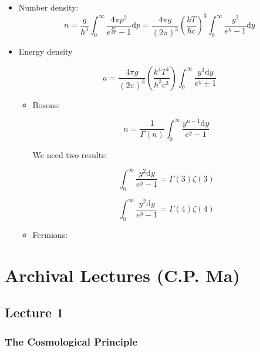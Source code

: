 \documentclass{article}
\newcommand{\be}{\begin{equation}}
\newcommand{\ee}{\end{equation}}
\begin{document}
\begin{itemize}
    \item Number density:
    \be
    n = \frac{g}{h^3}\int_0^\infty \frac{4\pi p^2}{e^{\frac{pc}{kT}} -1} \mathrm{d}p = \frac{4\pi g}{(2\pi)^3} \left(\frac{kT}{\hbar c}\right)^3 \int_0^\infty \frac{y^2}{e^{y} -1} \mathrm{d}y  
    \ee
    
    \item Energy density
    
    \be
    u = \frac{4\pi g}{(2\pi)^3}\left(\frac{k^4T^4}{\hbar^3 c^3}\right) \int_0^\infty \frac{y^3 \mathrm{d}y}{e^y \pm 1}
    \ee
    
    \begin{itemize}
        \item Bosons:
        
        \be
        n = \frac{1}{\Gamma(n)}\int_0^\infty \frac{y^{n-1} \mathrm{d}y}{e^y - 1}
        \ee
        
        We need two results:
        
        \be
        \int_0^\infty \frac{y^{2} \mathrm{d}y}{e^y - 1} = \Gamma(3) \zeta(3)
        \ee
        
        \be
        \int_0^\infty \frac{y^{2} \mathrm{d}y}{e^y - 1} = \Gamma(4) \zeta(4)
        \ee
        
        
        
        \item Fermions:
    \end{itemize}
\end{itemize}














\appendix 

\section{Archival Lectures (C.P. Ma)}

\subsection{Lecture 1}

\subsubsection{ The Cosmological Principle}
\end{document}
